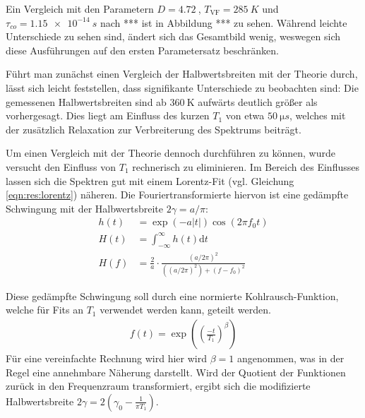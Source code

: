 Ein Vergleich mit den Parametern $D = \SI{4.72}{}$, $T_\text{VF} = \SI{285}{K}$ und $\tau_{co} = \SI{1.15e-14}{s}$ nach *** ist in Abbildung *** zu sehen. Während leichte Unterschiede zu sehen sind, ändert sich das Gesamtbild wenig, weswegen sich diese Ausführungen auf den ersten Parametersatz beschränken.




Führt man zunächst einen Vergleich der Halbwertsbreiten mit der Theorie durch, lässt sich leicht feststellen, dass signifikante Unterschiede zu beobachten sind: Die gemessenen Halbwertsbreiten sind ab $\SI{360}{\kelvin}$ aufwärts deutlich größer als vorhergesagt. Dies liegt am Einfluss des kurzen $T_1$ von etwa $\SI{50}{\micro s}$, welches mit der zusätzlich Relaxation zur Verbreiterung des Spektrums beiträgt.

Um einen Vergleich mit der Theorie dennoch durchführen zu können, wurde versucht den Einfluss von $T_1$ rechnerisch zu eliminieren. Im Bereich des Einflusses lassen sich die Spektren gut mit einem Lorentz-Fit (vgl. Gleichung \eqref{eqn:res:lorentz}) näheren. Die Fouriertransformierte hiervon ist eine gedämpfte Schwingung mit der Halbwertsbreite $2 \gamma = a/\pi$:
\begin{align}
	h(t) & = \exp{(-a |t|)} \cos{(2 \pi f_0 t)}                              \\
	H(t) & = \int_{-\infty}^{\infty} h(t) \text{d} t                         \\
	H(f) & = \frac{2}{a} \cdot \frac{(a/2\pi)^2}{((a/2\pi)^2) + (f - f_0)^2}
\end{align}

Diese gedämpfte Schwingung soll durch eine normierte Kohlrausch-Funktion, welche für Fits an $T_1$ verwendet werden kann, geteilt werden.
\begin{align}
	f(t) = \exp{\left( {\left(\frac{-t}{T_1} \right)}^\beta \right) }
\end{align}
Für eine vereinfachte Rechnung wird hier wird $\beta = 1$ angenommen, was in der Regel eine annehmbare Näherung darstellt. Wird der Quotient der Funktionen zurück in den Frequenzraum transformiert, ergibt sich die modifizierte Halbwertsbreite $2\gamma = 2(\gamma_0 - \frac{1}{\pi T_1})$.

